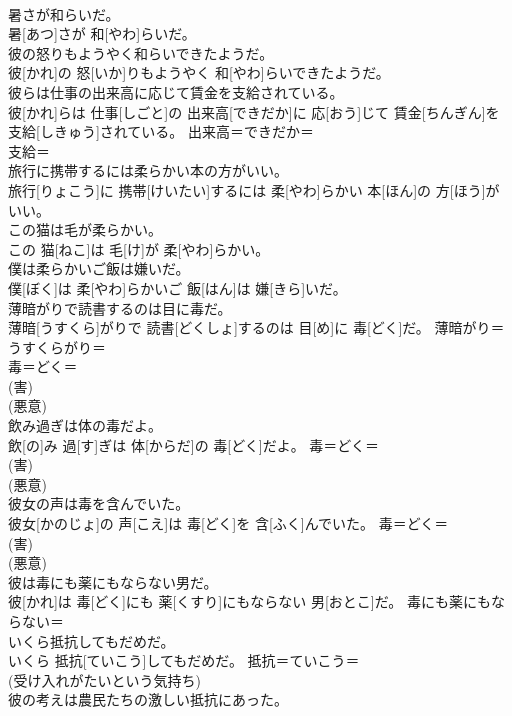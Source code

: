 \documentclass[8pt]{extreport}
\begin{document}
\begin{CJK}{UTF8}{min}
{\\	暑さが和らいだ。	
\\	暑[あつ]さが 和[やわ]らいだ。	
\\	彼の怒りもようやく和らいできたようだ。	
\\	彼[かれ]の 怒[いか]りもようやく 和[やわ]らいできたようだ。	
\\	彼らは仕事の出来高に応じて賃金を支給されている。	
\\	彼[かれ]らは 仕事[しごと]の 出来高[できだか]に 応[おう]じて 賃金[ちんぎん]を 支給[しきゅう]されている。	出来高＝できだか＝ 
\\	支給＝ 
\\	旅行に携帯するには柔らかい本の方がいい。	
\\	旅行[りょこう]に 携帯[けいたい]するには 柔[やわ]らかい 本[ほん]の 方[ほう]がいい。	
\\	この猫は毛が柔らかい。	
\\	この 猫[ねこ]は 毛[け]が 柔[やわ]らかい。	
\\	僕は柔らかいご飯は嫌いだ。	
\\	僕[ぼく]は 柔[やわ]らかいご 飯[はん]は 嫌[きら]いだ。	
\\	薄暗がりで読書するのは目に毒だ。	
\\	薄暗[うすくら]がりで 読書[どくしょ]するのは 目[め]に 毒[どく]だ。	薄暗がり＝うすくらがり＝ 
\\	毒＝どく＝ 
\\	(害) 
\\	(悪意) 
\\	飲み過ぎは体の毒だよ。	
\\	飲[の]み 過[す]ぎは 体[からだ]の 毒[どく]だよ。	毒＝どく＝ 
\\	(害) 
\\	(悪意) 
\\	彼女の声は毒を含んでいた。	
\\	彼女[かのじょ]の 声[こえ]は 毒[どく]を 含[ふく]んでいた。	毒＝どく＝ 
\\	(害) 
\\	(悪意) 
\\	彼は毒にも薬にもならない男だ。	
\\	彼[かれ]は 毒[どく]にも 薬[くすり]にもならない 男[おとこ]だ。	毒にも薬にもならない＝ 
\\	いくら抵抗してもだめだ。	
\\	いくら 抵抗[ていこう]してもだめだ。	抵抗＝ていこう＝ 
\\	(受け入れがたいという気持ち)
\\	彼の考えは農民たちの激しい抵抗にあった。	
}
\end{CJK}
\end{document}
